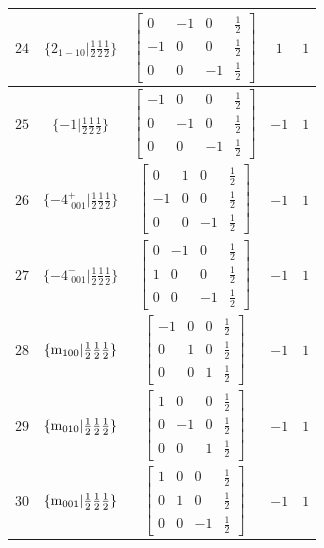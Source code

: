 \documentclass[fleqn,8pt]{jsarticle}
\begin{document}
\begin{longtable}{ccccc}
$ 24 $ & $ \{2{}_{1-10}|\frac{1}{2} \frac{1}{2} \frac{1}{2}\} $ & $ \begin{bmatrix} 0 & -1 & 0 & \frac{1}{2} \\ -1 & 0 & 0 & \frac{1}{2} \\ 0 & 0 & -1 & \frac{1}{2} \end{bmatrix} $ & $ 1 $ & $ 1 $ \\ \hline
$ 25 $ & $ \{-1|\frac{1}{2} \frac{1}{2} \frac{1}{2}\} $ & $ \begin{bmatrix} -1 & 0 & 0 & \frac{1}{2} \\ 0 & -1 & 0 & \frac{1}{2} \\ 0 & 0 & -1 & \frac{1}{2} \end{bmatrix} $ & $ -1 $ & $ 1 $ \\ \hline
$ 26 $ & $ \{-4^{+}_{\,\,001}|\frac{1}{2} \frac{1}{2} \frac{1}{2}\} $ & $ \begin{bmatrix} 0 & 1 & 0 & \frac{1}{2} \\ -1 & 0 & 0 & \frac{1}{2} \\ 0 & 0 & -1 & \frac{1}{2} \end{bmatrix} $ & $ -1 $ & $ 1 $ \\ \hline
$ 27 $ & $ \{-4^{-}_{\,\,001}|\frac{1}{2} \frac{1}{2} \frac{1}{2}\} $ & $ \begin{bmatrix} 0 & -1 & 0 & \frac{1}{2} \\ 1 & 0 & 0 & \frac{1}{2} \\ 0 & 0 & -1 & \frac{1}{2} \end{bmatrix} $ & $ -1 $ & $ 1 $ \\ \hline
$ 28 $ & $ \{{\rm m}_{100}|\frac{1}{2} \frac{1}{2} \frac{1}{2}\} $ & $ \begin{bmatrix} -1 & 0 & 0 & \frac{1}{2} \\ 0 & 1 & 0 & \frac{1}{2} \\ 0 & 0 & 1 & \frac{1}{2} \end{bmatrix} $ & $ -1 $ & $ 1 $ \\ \hline
$ 29 $ & $ \{{\rm m}_{010}|\frac{1}{2} \frac{1}{2} \frac{1}{2}\} $ & $ \begin{bmatrix} 1 & 0 & 0 & \frac{1}{2} \\ 0 & -1 & 0 & \frac{1}{2} \\ 0 & 0 & 1 & \frac{1}{2} \end{bmatrix} $ & $ -1 $ & $ 1 $ \\ \hline
$ 30 $ & $ \{{\rm m}_{001}|\frac{1}{2} \frac{1}{2} \frac{1}{2}\} $ & $ \begin{bmatrix} 1 & 0 & 0 & \frac{1}{2} \\ 0 & 1 & 0 & \frac{1}{2} \\ 0 & 0 & -1 & \frac{1}{2} \end{bmatrix} $ & $ -1 $ & $ 1 $ \\ \hline

\end{longtable}
\end{document}
